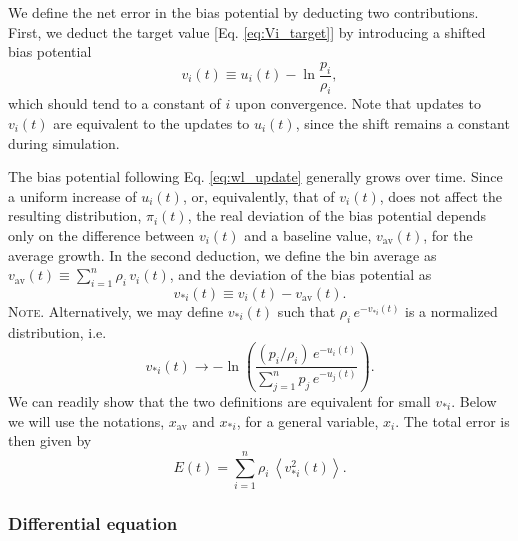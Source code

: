 \documentclass[reprint, superscriptaddress, floatfix]{revtex4-1}
\newcommand{\note}[1]{{\color{DarkGreen}\footnotesize \textsc{Note.} #1}}
\newcommand{\Err}{E}
\newcommand{\bav}[1]{#1_\mathrm{av}}
\begin{document}
We define the net error in the bias potential
by deducting two contributions.
%
First, we deduct the target value
[Eq. \eqref{eq:Vi_target}]
by introducing a shifted bias potential
%
\begin{equation}
  v_i(t)
  \equiv
  u_i(t)
  -
  \ln \frac { p_i }
            { \rho_i }
  ,
  \label{eq:v_def}
\end{equation}
%
which should tend to a constant of $i$
upon convergence.
Note that updates to $v_i(t)$ are
equivalent to the updates to $u_i(t)$,
since the shift
remains a constant during simulation.


The bias potential following Eq. \eqref{eq:wl_update}
generally grows over time.
%
Since a uniform increase of $u_i(t)$, or, equivalently, that of $v_i(t)$,
does not affect the resulting distribution, $\pi_i(t)$,
the real deviation of the bias potential
depends only on the difference between $v_i(t)$
and a baseline value, $\bav{v}(t)$,
for the average growth\cite{
dama2014}.
%
In the second deduction, we define
the bin average as $\bav{v}(t) \equiv \sum_{i=1}^n \rho_i \, v_i(t)$,
and the deviation of the bias potential as
%
\begin{equation}
  v_{*i}(t) \equiv v_i(t) - \bav{v}(t)
  .
\label{eq:x_def}
\end{equation}
%
\note{Alternatively,
  we may define $v_{*i}(t)$ such that
  $\rho_i \, e^{-v_{*i}(t)}$ is a normalized distribution,
  i.e.
  $$
  v_{*i}(t) \to -\ln\left(
    \frac{ (p_i/\rho_i) \, e^{ -u_i(t) } }
    { \sum_{j=1}^n p_j \, e^{ -u_j(t) } }
  \right).
  $$
  We can readily show that the two definitions are equivalent
  for small $v_{*i}$.}%
%
Below we will use the notations, $\bav{x}$ and $x_{*i}$,
for a general variable, $x_i$.
%
The total error is then given by
%
\begin{equation}
  \Err(t)
  =
  \sum_{i = 1}^n \rho_i \,
  \left\langle v_{*i}^2(t) \right\rangle
  .
\label{eq:error_def}
\end{equation}




\subsubsection{\label{sec:sbin_diffeq}
Differential equation}
\end{document}
